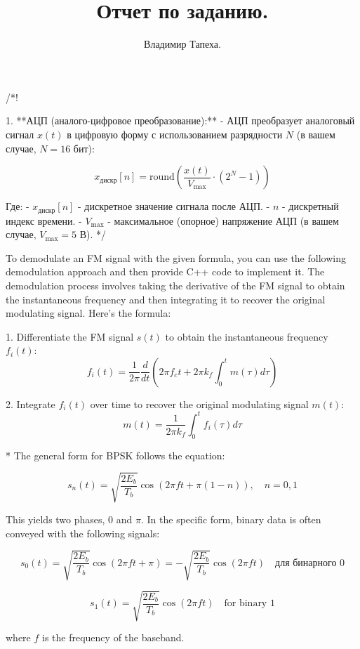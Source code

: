 \documentclass[14pt, report]{extarticle}
\title{Отчет по заданию.}
\author{Владимир Тапеха.}
\begin{document}
\maketitle

/*!

1. **АЦП (аналого-цифровое преобразование):**
   - АЦП преобразует аналоговый сигнал \(x(t)\) в цифровую форму с использованием разрядности \(N\) (в вашем случае, \(N = 16\) бит):

     \[x_{\text{дискр}}[n] = \text{round}\left(\frac{x(t)}{V_{\text{max}}} \cdot (2^N - 1)\right)\]

     Где:
     - \(x_{\text{дискр}}[n]\) - дискретное значение сигнала после АЦП.
     - \(n\) - дискретный индекс времени.
     - \(V_{\text{max}}\) - максимальное (опорное) напряжение АЦП (в вашем случае, \(V_{\text{max}} = 5\) В).
*/

\newpage
To demodulate an FM signal with the given formula, you can use the following demodulation approach and then provide C++ code to implement it. The demodulation process involves taking the derivative of the FM signal to obtain the instantaneous frequency and then integrating it to recover the original modulating signal. Here's the formula:

1. Differentiate the FM signal \(s(t)\) to obtain the instantaneous frequency \(f_i(t)\):
\[f_i(t) = \frac{1}{2\pi} \frac{d}{dt}\left(2\pi f_c t + 2\pi k_f \int_{0}^{t} m(\tau) d\tau\right)\]

2. Integrate \(f_i(t)\) over time to recover the original modulating signal \(m(t)\):
\[m(t) = \frac{1}{2\pi k_f} \int_{0}^{t} f_i(\tau) d\tau\]

\par %

* The general form for BPSK follows the equation:

\[
s_{n}(t) = \sqrt{\frac{2E_{b}}{T_{b}}} \cos\left(2\pi ft + \pi(1-n)\right), \quad n=0,1
\]

This yields two phases, 0 and $\pi$. In the specific form, binary data is often conveyed with the following signals:

\[
s_{0}(t) = \sqrt{\frac{2E_{b}}{T_{b}}} \cos\left(2\pi ft + \pi\right) = -\sqrt{\frac{2E_{b}}{T_{b}}} \cos\left(2\pi ft\right) \quad \text{для бинарного 0}
\]

\[
s_{1}(t) = \sqrt{\frac{2E_{b}}{T_{b}}} \cos\left(2\pi ft\right) \quad \text{for binary 1}
\]

where \( f \) is the frequency of the baseband.
\end{document}
